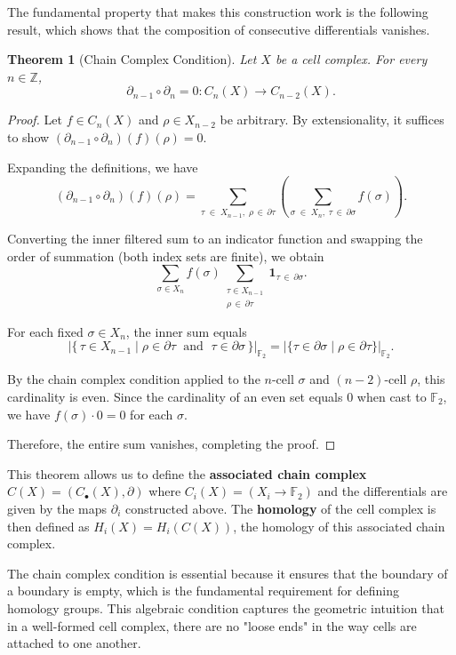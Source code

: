 \documentclass[11pt]{article}
\theoremstyle{plain}
\newtheorem*{theorem}{Theorem}
\theoremstyle{definition}
\theoremstyle{remark}
\begin{document}
The fundamental property that makes this construction work is the following result, which shows that the composition of consecutive differentials vanishes.

\begin{theorem}[Chain Complex Condition]
Let $X$ be a cell complex. For every $n \in \mathbb{Z}$,
\[
  \partial_{n-1} \circ \partial_n = 0 : C_n(X) \longrightarrow C_{n-2}(X).
\]
\end{theorem}

\begin{proof}
Let $f \in C_n(X)$ and $\rho \in X_{n-2}$ be arbitrary. By extensionality, it suffices to show $(\partial_{n-1} \circ \partial_n)(f)(\rho) = 0$.

Expanding the definitions, we have
\[
  (\partial_{n-1} \circ \partial_n)(f)(\rho) = \sum_{\tau \;\in\; X_{n-1},\; \rho \,\in\, \partial\tau} \left(\sum_{\sigma \;\in\; X_n,\; \tau \,\in\, \partial\sigma} f(\sigma)\right).
\]

Converting the inner filtered sum to an indicator function and swapping the order of summation (both index sets are finite), we obtain
\[
  \sum_{\sigma \in X_n} f(\sigma) \sum_{\substack{\tau \in X_{n-1} \\ \rho \,\in\, \partial\tau}} \mathbf{1}_{\tau \,\in\, \partial\sigma}.
\]

For each fixed $\sigma \in X_n$, the inner sum equals
\[
  \left|\bigl\{\, \tau \in X_{n-1} \;\big|\; \rho \in \partial\tau \;\text{ and }\; \tau \in \partial\sigma \,\bigr\}\right|_{\mathbb{F}_2} = \left|\{\tau \in \partial\sigma \mid \rho \in \partial\tau\}\right|_{\mathbb{F}_2}.
\]

By the chain complex condition applied to the $n$-cell $\sigma$ and $(n-2)$-cell $\rho$, this cardinality is even. Since the cardinality of an even set equals $0$ when cast to $\mathbb{F}_2$, we have $f(\sigma) \cdot 0 = 0$ for each $\sigma$.

Therefore, the entire sum vanishes, completing the proof.
\end{proof}

This theorem allows us to define the \textbf{associated chain complex} $C(X) = (C_\bullet(X), \partial)$ where $C_i(X) = (X_i \to \mathbb{F}_2)$ and the differentials are given by the maps $\partial_i$ constructed above. The \textbf{homology} of the cell complex is then defined as $H_i(X) = H_i(C(X))$, the homology of this associated chain complex.

The chain complex condition is essential because it ensures that the boundary of a boundary is empty, which is the fundamental requirement for defining homology groups. This algebraic condition captures the geometric intuition that in a well-formed cell complex, there are no "loose ends" in the way cells are attached to one another.
\end{document}

